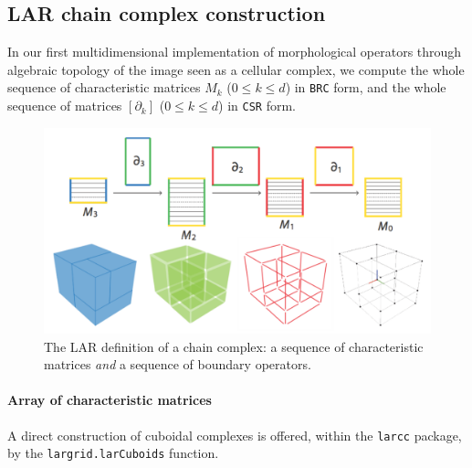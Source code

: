 \documentclass[11pt,oneside]{article}	%
\begin{document}
\subsection{LAR chain complex construction}

In our first multidimensional implementation of morphological operators through algebraic topology of the image seen as a cellular complex, we compute the whole sequence of characteristic matrices $M_k$ ($0\leq k \leq d$) in \texttt{BRC} form, and the whole sequence of matrices $[\partial_k]$ ($0\leq k \leq d$) in \texttt{CSR} form.

\begin{figure}[htbp] %
   \centering
   \includegraphics[width=0.7\linewidth]{images/larcomplex} 
   \caption{The LAR definition of  a chain complex: a sequence of characteristic matrices \emph{and} a sequence of boundary operators.}
   \label{fig:example}
\end{figure}

\paragraph{Array of characteristic matrices}

A direct construction of cuboidal complexes is offered, within the \texttt{larcc} package, by the \texttt{largrid.larCuboids} function. 
\end{document}
